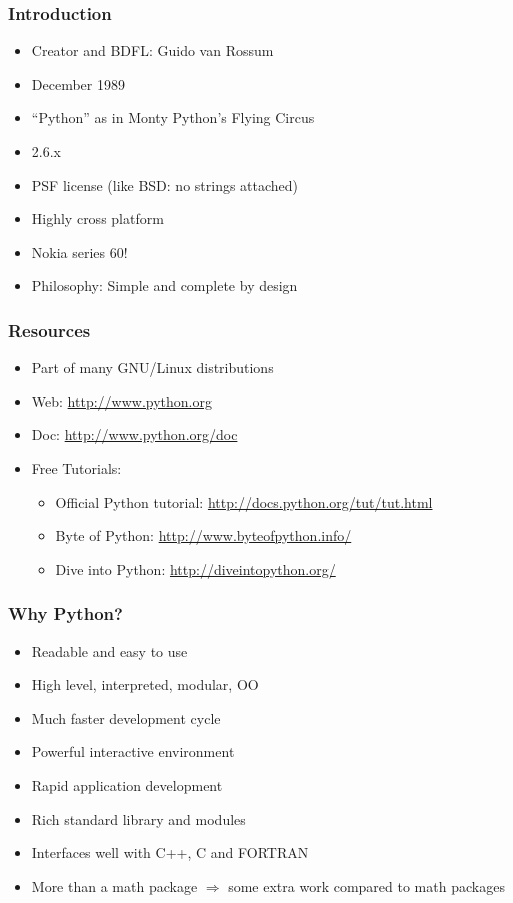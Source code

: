 \documentclass[14pt,compress]{beamer}
\begin{document}
\begin{frame}
  \frametitle{Introduction}
  \begin{itemize}
  \item Creator and BDFL: Guido van Rossum
  \item December 1989
  \item ``Python'' as in Monty Python's Flying Circus
  \item 2.6.x
  \item PSF license (like BSD: no strings attached)
  \item Highly cross platform
  \item Nokia series 60!
  \item \alert{Philosophy:} Simple and complete by design
  \end{itemize}
\end{frame}

\begin{frame}
  \frametitle{Resources}
  \begin{itemize}
  \item Part of many GNU/Linux distributions
  \item Web: \url{http://www.python.org}
  \item Doc: \url{http://www.python.org/doc}
  \item Free Tutorials:
    \begin{itemize}
    \item Official Python tutorial: \url{http://docs.python.org/tut/tut.html}
    \item Byte of Python: \url{http://www.byteofpython.info/}
    \item Dive into Python: \url{http://diveintopython.org/}
    \end{itemize}
  \end{itemize}
\end{frame}

\begin{frame}
  \frametitle{Why Python?}
  \begin{itemize}
  \item Readable and easy to use
  \item High level, interpreted, modular, OO
  \item Much faster development cycle
  \item Powerful interactive environment
  \item Rapid application development
  \item Rich standard library and modules
  \item Interfaces well with C++, C and FORTRAN
  \item \alert{More than a math package $\Rightarrow$ some extra work compared to math packages}
  \end{itemize}
\end{frame}
\end{document}
